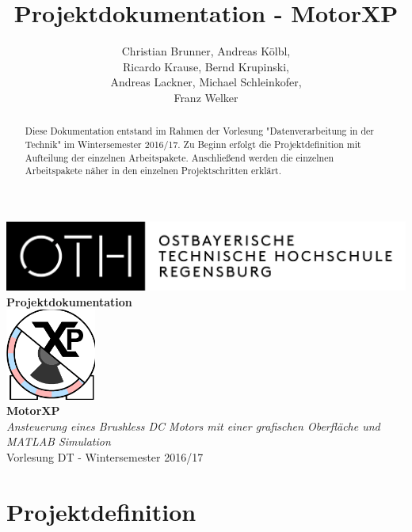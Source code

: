 \documentclass[a4paper,11pt]{report}
\title{Projektdokumentation - MotorXP}
\author{Christian Brunner, Andreas Kölbl, \\
  Ricardo Krause, Bernd Krupinski, \\
  Andreas Lackner, Michael Schleinkofer, \\
  Franz Welker}
\begin{document}
\makeatletter
\begin{titlepage}
  \centering
  \vspace*{0.02\textheight}
  \includegraphics[width=\textwidth]{images/OTHLogo}\vspace*{0.1\textheight}
  {\huge\textbf{\\Projektdokumentation\\}}\vspace*{0.05\textheight}
  \includegraphics[height=3cm]{images/MotorXP}\vspace*{0.05\textheight}
  {\huge\textbf{\\MotorXP}}\vspace*{0.03\textheight}
  {\large\textit{\\Ansteuerung eines Brushless DC Motors mit einer grafischen Oberfläche und MATLAB Simulation}}\vspace*{0.03\textheight}
  {\\Vorlesung DT - Wintersemester 2016/17\\}\vspace*{0.2\textheight}
  {\@author}
\end{titlepage}
\makeatother
\tableofcontents

\begin{abstract}
Diese Dokumentation entstand im Rahmen der Vorlesung "Datenverarbeitung in der Technik" im Wintersemester 2016/17. Zu Beginn erfolgt die
Projektdefinition mit Aufteilung der einzelnen Arbeitspakete. Anschließend werden die einzelnen Arbeitspakete näher in den einzelnen Projektschritten erklärt.
\end{abstract}

\chapter{Projektdefinition}

\end{document}
